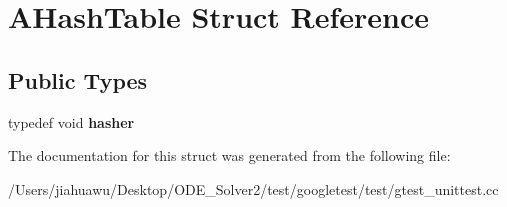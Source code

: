 \hypertarget{struct_a_hash_table}{}\section{A\+Hash\+Table Struct Reference}
\label{struct_a_hash_table}
\subsection*{Public Types}
\begin{DoxyCompactItemize}
\item 
\mbox{\label{struct_a_hash_table_af0df4ce57a783be396e80cb8df6b6259}} 
typedef void {\bfseries hasher}
\end{DoxyCompactItemize}


The documentation for this struct was generated from the following file\+:\begin{DoxyCompactItemize}
\item 
/\+Users/jiahuawu/\+Desktop/\+O\+D\+E\+\_\+\+Solver2/test/googletest/test/gtest\+\_\+unittest.\+cc\end{DoxyCompactItemize}
